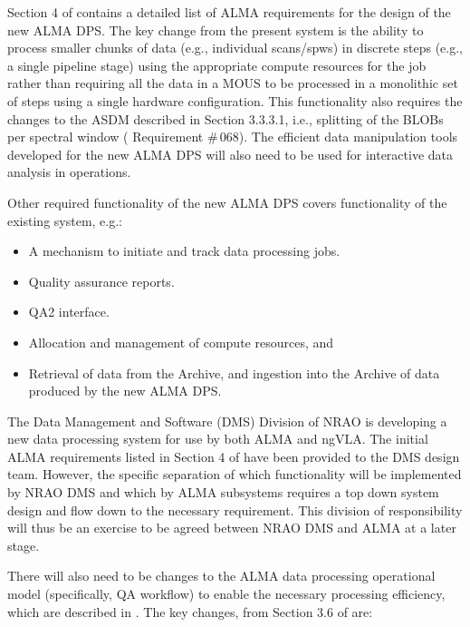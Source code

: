 Section 4 of \cite{dp} contains a detailed list of ALMA requirements for the design of the new ALMA DPS. The key change from the present system is the ability to process smaller chunks of data (e.g., individual scans/spws) in discrete steps (e.g., a single pipeline stage) using the appropriate compute resources for the job rather than requiring all the data in a MOUS to be processed in a monolithic set of steps using a single hardware configuration. This functionality also requires the changes to the ASDM described in Section 3.3.3.1, i.e., splitting of the BLOBs per spectral window (\cite{dp} Requirement \#\,068). The efficient data manipulation tools developed for the new ALMA DPS will also need to be used for interactive data analysis in operations. 

Other required functionality of the new ALMA DPS covers functionality of the existing system, e.g.:

\begin{itemize}[itemsep=-0.5em]
    \item A mechanism to initiate and track data processing jobs.
    \item Quality assurance reports.
    \item QA2 interface.
    \item Allocation and management of compute resources, and
    \item Retrieval of data from the Archive, and ingestion into the Archive of data produced by the new ALMA DPS.
\end{itemize}

The Data Management and Software (DMS) Division of NRAO is developing a new data processing system for use by both ALMA and ngVLA. The initial ALMA requirements listed in Section 4 of \cite{dp} have been provided to the DMS design team. However, the specific separation of which functionality will be implemented by NRAO DMS and which by ALMA subsystems requires a top down system design and flow down to the necessary requirement. This division of responsibility will thus be an exercise to be agreed between NRAO DMS and ALMA at a later stage.

There will also need to be changes to the ALMA data processing operational model (specifically, QA workflow) to enable the necessary processing efficiency, which are described in \cite{dp}. The key changes, from Section 3.6 of \cite{dp} are:


